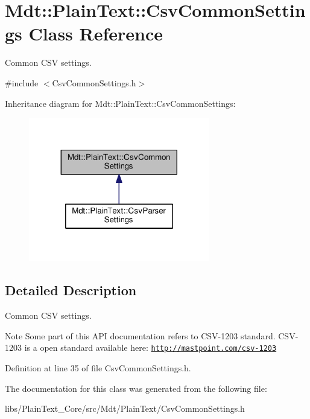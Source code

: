 \hypertarget{class_mdt_1_1_plain_text_1_1_csv_common_settings}{}\section{Mdt\+:\+:Plain\+Text\+:\+:Csv\+Common\+Settings Class Reference}
\label{class_mdt_1_1_plain_text_1_1_csv_common_settings}


Common C\+SV settings.  




{\ttfamily \#include $<$Csv\+Common\+Settings.\+h$>$}



Inheritance diagram for Mdt\+:\+:Plain\+Text\+:\+:Csv\+Common\+Settings\+:\nopagebreak
\begin{figure}[H]
\begin{center}
\leavevmode
\includegraphics[width=224pt]{class_mdt_1_1_plain_text_1_1_csv_common_settings__inherit__graph}
\end{center}
\end{figure}


\subsection{Detailed Description}
Common C\+SV settings. 

\begin{DoxyNote}{Note}
Some part of this A\+PI documentation refers to C\+S\+V-\/1203 standard. C\+S\+V-\/1203 is a open standard available here\+: \href{http://mastpoint.com/csv-1203}{\tt http\+://mastpoint.\+com/csv-\/1203} 
\end{DoxyNote}


Definition at line 35 of file Csv\+Common\+Settings.\+h.



The documentation for this class was generated from the following file\+:\begin{DoxyCompactItemize}
\item 
libs/\+Plain\+Text\+\_\+\+Core/src/\+Mdt/\+Plain\+Text/Csv\+Common\+Settings.\+h\end{DoxyCompactItemize}
